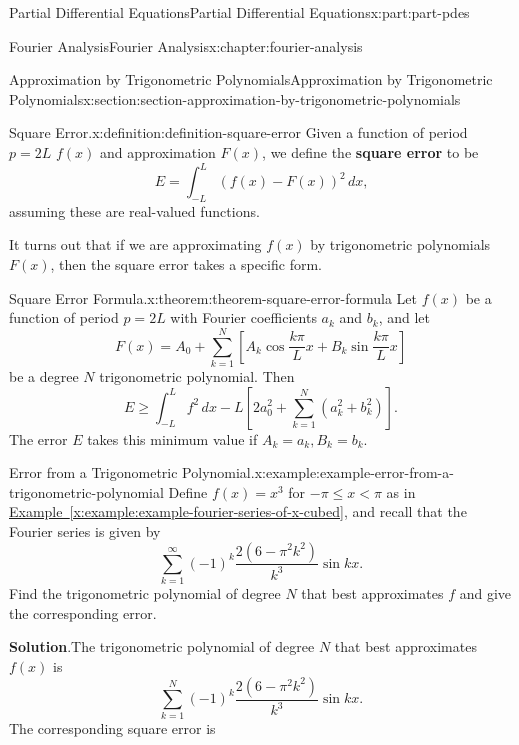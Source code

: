 \documentclass[twoside,10pt,]{book}
\newcommand{\blocktitlefont}{\relax}
\newcommand{\xreffont}{\relax}
\newcommand{\terminology}[1]{\textbf{#1}}
\numberwithin{equation}{part}
\begin{document}
\begin{partptx}{Partial Differential Equations}{}{Partial Differential Equations}{}{}{x:part:part-pdes}
\begin{chapterptx}{Fourier Analysis}{}{Fourier Analysis}{}{}{x:chapter:fourier-analysis}
\begin{sectionptx}{Approximation by Trigonometric Polynomials}{}{Approximation by Trigonometric Polynomials}{}{}{x:section:section-approximation-by-trigonometric-polynomials}
\begin{definition}{Square Error.}{x:definition:definition-square-error}%
Given a function of period \(p = 2L\) \(f(x)\) and approximation \(F(x)\), we define the \terminology{square error} to be%
\begin{equation*}
E = \int_{-L}^{L}(f(x) - F(x))^{2}\,dx\text{,}
\end{equation*}
assuming these are real-valued functions.%
\end{definition}
It turns out that if we are approximating \(f(x)\) by trigonometric polynomials \(F(x)\), then the square error takes a specific form.%
\begin{theorem}{Square Error Formula.}{}{x:theorem:theorem-square-error-formula}%
Let \(f(x)\) be a function of period \(p = 2L\) with Fourier coefficients \(a_{k}\) and \(b_{k}\), and let%
\begin{equation*}
F(x) = A_{0} + \sum_{k=1}^{N}[A_{k}\cos\frac{k\pi}{L}x + B_{k}\sin\frac{k\pi}{L}x]
\end{equation*}
be a degree \(N\) trigonometric polynomial. Then%
\begin{equation*}
E \geq \int_{-L}^{L}f^{2}\,dx - L\left[2a_{0}^{2} + \sum_{k=1}^{N}(a_{k}^{2} + b_{k}^{2})\right]\text{.}
\end{equation*}
The error \(E\) takes this minimum value if \(A_{k} = a_{k}, B_{k} = b_{k}\).%
\end{theorem}
\begin{example}{Error from a Trigonometric Polynomial.}{x:example:example-error-from-a-trigonometric-polynomial}%
Define \(f(x) = x^{3}\) for \(-\pi\leq x < \pi\) as in \hyperref[x:example:example-fourier-series-of-x-cubed]{Example~{\xreffont\ref{x:example:example-fourier-series-of-x-cubed}}}, and recall that the Fourier series is given by%
\begin{equation*}
\sum_{k = 1}^{\infty}(-1)^{k}\frac{2(6 - \pi^{2}k^{2})}{k^{3}}\sin kx\text{.}
\end{equation*}
Find the trigonometric polynomial of degree \(N\) that best approximates \(f\) and give the corresponding error.%
\par\smallskip%
\noindent\textbf{\blocktitlefont Solution}.\hypertarget{g:solution:idp105548816819104}{}\quad{}The trigonometric polynomial of degree \(N\) that best approximates \(f(x)\) is%
\begin{equation*}
\sum_{k = 1}^{N}(-1)^{k}\frac{2(6 - \pi^{2}k^{2})}{k^{3}}\sin kx\text{.}
\end{equation*}
The corresponding square error is%

\end{example}
\end{sectionptx}
\end{chapterptx}
\end{partptx}
\end{document}
